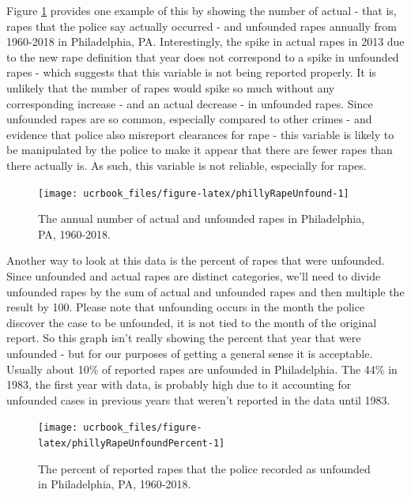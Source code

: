 \documentclass[
  12pt,
  openany]{book}
\begin{document}
Figure \ref{fig:phillyRapeUnfound} provides one example of this by showing the number of actual - that is, rapes that the police say actually occurred - and unfounded rapes annually from 1960-2018 in Philadelphia, PA. Interestingly, the spike in actual rapes in 2013 due to the new rape definition that year does not correspond to a spike in unfounded rapes - which suggests that this variable is not being reported properly. It is unlikely that the number of rapes would spike so much without any corresponding increase - and an actual decrease - in unfounded rapes. Since unfounded rapes are so common, especially compared to other crimes - and evidence that police also misreport clearances for rape - this variable is likely to be manipulated by the police to make it appear that there are fewer rapes than there actually is. As such, this variable is not reliable, especially for rapes.

\begin{figure}

{\centering \texttt{[image: ucrbook\_files/figure-latex/phillyRapeUnfound-1]} 

}

\caption{The annual number of actual and unfounded rapes in Philadelphia, PA, 1960-2018.}\label{fig:phillyRapeUnfound}
\end{figure}

Another way to look at this data is the percent of rapes that were unfounded. Since unfounded and actual rapes are distinct categories, we'll need to divide unfounded rapes by the sum of actual and unfounded rapes and then multiple the result by 100. Please note that unfounding occurs in the month the police discover the case to be unfounded, it is not tied to the month of the original report. So this graph isn't really showing the percent that year that were unfounded - but for our purposes of getting a general sense it is acceptable. Usually about 10\% of reported rapes are unfounded in Philadelphia. The 44\% in 1983, the first year with data, is probably high due to it accounting for unfounded cases in previous years that weren't reported in the data until 1983.

\begin{figure}

{\centering \texttt{[image: ucrbook\_files/figure-latex/phillyRapeUnfoundPercent-1]} 

}

\caption{The percent of reported rapes that the police recorded as unfounded in Philadelphia, PA, 1960-2018.}\label{fig:phillyRapeUnfoundPercent}
\end{figure}
\end{document}
